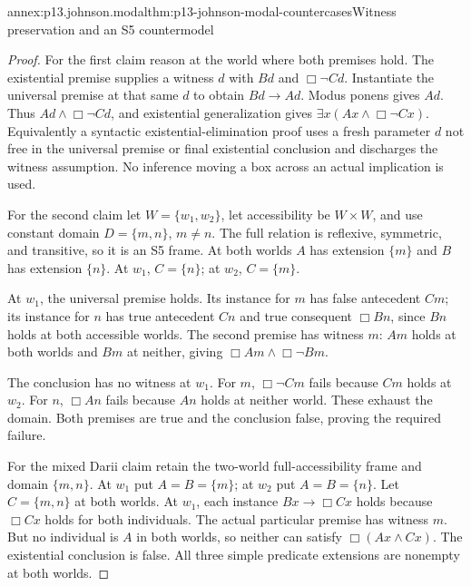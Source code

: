 \begin{annexitem}{annex:p13.johnson.modal}{thm:p13-johnson-modal-countercases}{Witness preservation and an S5 countermodel}
\begin{proof}
For the first claim reason at the world where both premises hold.
The existential premise supplies a witness \(d\) with \(Bd\) and
\(\Box\neg Cd\). Instantiate the universal premise at that same
\(d\) to obtain \(Bd\to Ad\). Modus ponens gives \(Ad\).
Thus \(Ad\land\Box\neg Cd\), and existential generalization gives
\(\exists x(Ax\land\Box\neg Cx)\). Equivalently a syntactic
existential-elimination proof uses a fresh parameter \(d\) not free in
the universal premise or final existential conclusion and discharges
the witness assumption. No inference moving a box across an actual
implication is used.

For the second claim let \(W=\{w_1,w_2\}\), let accessibility be
\(W\times W\), and use constant domain \(D=\{m,n\}\), \(m\ne n\).
The full relation is reflexive, symmetric, and transitive, so it is
an S5 frame. At both worlds \(A\) has extension \(\{m\}\) and
\(B\) has extension \(\{n\}\).
At \(w_1\), \(C=\{n\}\); at \(w_2\), \(C=\{m\}\).

At \(w_1\), the universal premise holds. Its instance for \(m\)
has false antecedent \(Cm\); its instance for \(n\) has true
antecedent \(Cn\) and true consequent \(\Box Bn\), since \(Bn\)
holds at both accessible worlds. The second premise has witness \(m\):
\(Am\) holds at both worlds and \(Bm\) at neither, giving
\(\Box Am\land\Box\neg Bm\).

The conclusion has no witness at \(w_1\). For \(m\),
\(\Box\neg Cm\) fails because \(Cm\) holds at \(w_2\).
For \(n\), \(\Box An\) fails because \(An\) holds at neither
world. These exhaust the domain. Both premises are true and the
conclusion false, proving the required failure.

For the mixed Darii claim retain the two-world full-accessibility
frame and domain \(\{m,n\}\). At \(w_1\) put \(A=B=\{m\}\);
at \(w_2\) put \(A=B=\{n\}\). Let \(C=\{m,n\}\) at both
worlds. At \(w_1\), each instance \(Bx\to\Box Cx\) holds because
\(\Box Cx\) holds for both individuals. The actual particular
premise has witness \(m\). But no individual is \(A\) in both
worlds, so neither can satisfy \(\Box(Ax\land Cx)\).
The existential conclusion is false. All three simple predicate
extensions are nonempty at both worlds.
\end{proof}
\end{annexitem}

